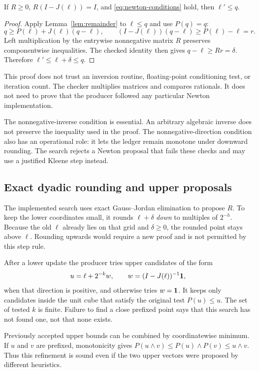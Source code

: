 \begin{theorem}
\label{thm:newton}
If $R\ge0$, $R(I-J(\ell))=I$, and \eqref{eq:newton-conditions} hold, then $\ell'\le q$.
\end{theorem}
\begin{proof}
Apply Lemma~\ref{lem:remainder} to $\ell\le q$ and use $P(q)=q$:
\[
 q\ge P(\ell)+J(\ell)(q-\ell),
 \qquad
 (I-J(\ell))(q-\ell)\ge P(\ell)-\ell=r.
\]
Left multiplication by the entrywise nonnegative matrix $R$ preserves componentwise inequalities. The checked identity then gives $q-\ell\ge Rr=\delta$. Therefore $\ell'\le\ell+\delta\le q$.
\end{proof}

This proof does not trust an inversion routine, floating-point conditioning test, or iteration count. The checker multiplies matrices and compares rationals. It does not need to prove that the producer followed any particular Newton implementation.

The nonnegative-inverse condition is essential. An arbitrary algebraic inverse does not preserve the inequality used in the proof. The nonnegative-direction condition also has an operational role: it lets the ledger remain monotone under downward rounding. The search rejects a Newton proposal that fails these checks and may use a justified Kleene step instead.

\subsection{Exact dyadic rounding and upper proposals}
The implemented search uses exact Gauss--Jordan elimination to propose $R$. To keep the lower coordinates small, it rounds $\ell+\delta$ \emph{down} to multiples of $2^{-h}$. Because the old $\ell$ already lies on that grid and $\delta\ge0$, the rounded point stays above $\ell$. Rounding upwards would require a new proof and is not permitted by this step rule.

After a lower update the producer tries upper candidates of the form
\[
 u=\ell+2^{-k}w,\qquad
 w=(I-J(\ell))^{-1}\mathbf 1,
\]
when that direction is positive, and otherwise tries $w=\mathbf 1$. It keeps only candidates inside the unit cube that satisfy the original test $P(u)\le u$. The set of tested $k$ is finite. Failure to find a close prefixed point says that this search has not found one, not that none exists.

Previously accepted upper bounds can be combined by coordinatewise minimum. If $u$ and $v$ are prefixed, monotonicity gives $P(u\wedge v)\le P(u)\wedge P(v)\le u\wedge v$. Thus this refinement is sound even if the two upper vectors were proposed by different heuristics.

